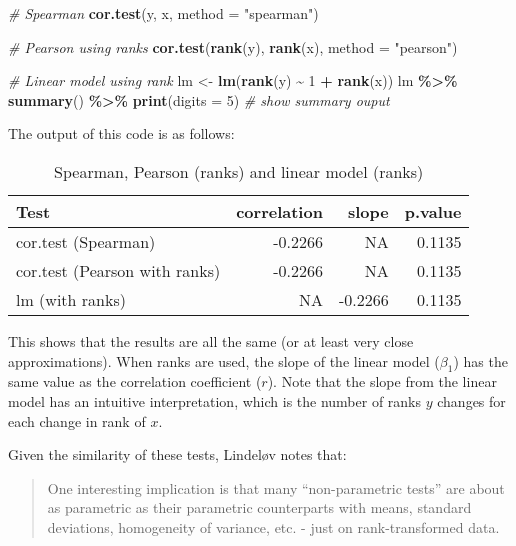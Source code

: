 \documentclass[
  12pt,
]{krantz}
\newenvironment{Shaded}{\begin{snugshade}}{\end{snugshade}}
\newcommand{\CommentTok}[1]{\textcolor[rgb]{0.56,0.35,0.01}{\textit{#1}}}
\newcommand{\DataTypeTok}[1]{\textcolor[rgb]{0.13,0.29,0.53}{#1}}
\newcommand{\DecValTok}[1]{\textcolor[rgb]{0.00,0.00,0.81}{#1}}
\newcommand{\KeywordTok}[1]{\textcolor[rgb]{0.13,0.29,0.53}{\textbf{#1}}}
\newcommand{\NormalTok}[1]{#1}
\newcommand{\OperatorTok}[1]{\textcolor[rgb]{0.81,0.36,0.00}{\textbf{#1}}}
\newcommand{\StringTok}[1]{\textcolor[rgb]{0.31,0.60,0.02}{#1}}
\begin{document}
\begin{Shaded}
\begin{Highlighting}[]
\CommentTok{\# Spearman}
\KeywordTok{cor.test}\NormalTok{(y, x, }\DataTypeTok{method =} \StringTok{"spearman"}\NormalTok{)}

\CommentTok{\# Pearson using ranks}
\KeywordTok{cor.test}\NormalTok{(}\KeywordTok{rank}\NormalTok{(y), }\KeywordTok{rank}\NormalTok{(x), }\DataTypeTok{method =} \StringTok{"pearson"}\NormalTok{)}

\CommentTok{\# Linear model using rank}
\NormalTok{lm \textless{}{-}}\StringTok{ }\KeywordTok{lm}\NormalTok{(}\KeywordTok{rank}\NormalTok{(y) }\OperatorTok{\textasciitilde{}}\StringTok{ }\DecValTok{1} \OperatorTok{+}\StringTok{ }\KeywordTok{rank}\NormalTok{(x))}
\NormalTok{  lm }\OperatorTok{\%\textgreater{}\%}\StringTok{ }\KeywordTok{summary}\NormalTok{() }\OperatorTok{\%\textgreater{}\%}\StringTok{ }\KeywordTok{print}\NormalTok{(}\DataTypeTok{digits =} \DecValTok{5}\NormalTok{) }\CommentTok{\# show summary ouput}
\end{Highlighting}
\end{Shaded}

The output of this code is as follows:

\begin{table}

\caption{\label{tab:unnamed-chunk-16}Spearman, Pearson (ranks) and linear model (ranks)}
\centering
\begin{tabular}[t]{lrrr}
\toprule
Test & correlation & slope & p.value\\
\midrule
cor.test (Spearman) & -0.2266 & NA & 0.1135\\
cor.test (Pearson with ranks) & -0.2266 & NA & 0.1135\\
lm (with ranks) & NA & -0.2266 & 0.1135\\
\bottomrule
\end{tabular}
\end{table}

This shows that the results are all the same (or at least very close approximations). When ranks are used, the slope of the linear model (\(\beta_1\)) has the same value as the correlation coefficient (\(r\)). Note that the slope from the linear model has an intuitive interpretation, which is the number of ranks \(y\) changes for each change in rank of \(x\).

Given the similarity of these tests, Lindeløv notes that:

\begin{quote}
One interesting implication is that many ``non-parametric tests'' are about as parametric as their parametric counterparts with means, standard deviations, homogeneity of variance, etc. - just on rank-transformed data.
\end{quote}
\end{document}
